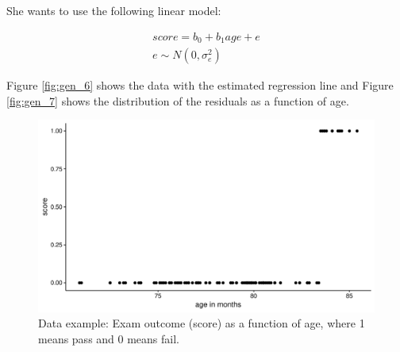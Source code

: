 \documentclass[]{book}\usepackage[]{graphicx}\usepackage[]{color}
\makeatletter
\def\maxwidth{ %
  \ifdim\Gin@nat@width>\linewidth
    \linewidth
  \else
    \Gin@nat@width
  \fi
}
\newenvironment{knitrout}{}{} %
\makeatother
\begin{document}
She wants to use the following linear model:

\begin{eqnarray}
score = b_0 + b_1 age  + e \\
e \sim N(0, \sigma_e^2)
\end{eqnarray}

Figure \ref{fig:gen_6} shows the data with the estimated regression line and Figure \ref{fig:gen_7} shows the distribution of the residuals as a function of age.


\begin{knitrout}
\color{fgcolor}\begin{figure}

{\centering \includegraphics[width=\maxwidth]{figure/gen_5-1} 

}

\caption[Data example]{Data example: Exam outcome (score) as a function of age, where 1 means pass and 0 means fail.}\label{fig:gen_5}
\end{figure}


\end{knitrout}
\end{document}
